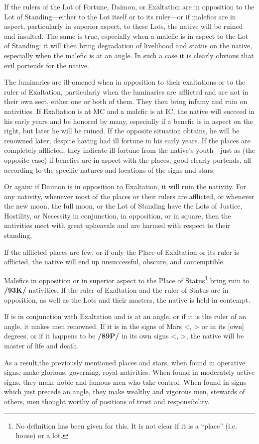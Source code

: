If the rulers of the Lot of Fortune, Daimon, or Exaltation are in opposition to the Lot of Standing—either to the Lot itself or to its ruler—or if malefics are in aspect, particularly in superior aspect, to these Lots, the native will be ruined and insulted. The same is true, especially when a malefic is in
aspect to the Lot of Standing: it will then bring degradation of livelihood and status on the native, especially when the malefic is at an angle. In such a case it is clearly obvious that evil portends for the native.

The luminaries are ill-omened when in opposition to their exaltations or to the ruler of Exaltation, particularly when the luminaries are afflicted and are not in their own sect, either one or both of them. They then bring infamy and ruin on nativities. If Exaltation is at MC and a malefic is at IC, the native will succeed in his early years and be honored by many, especially if a benefic is in aspect on the right, but later he will be ruined. If the opposite situation obtains, he will be renowned later, despite having had ill fortune in his early years. If the places are completely afflicted, they indicate ill-fortune from the native’s youth—just as (the opposite case) if benefics are in aspect with the places, good clearly portends, all according to the specific natures and locations of the signs and stars.

Or again: if Daimon is in opposition to Exaltation, it will ruin the nativity. For any nativity, whenever most of the places or their rulers are afflicted, or whenever the new moon, the full moon, or the Lot of Standing have the Lots of Justice, Hostility, or Necessity in conjunction, in opposition, or in
square, then the nativities meet with great upheavals and are harmed with respect to their standing. 

If the afflicted places are few, or if only the Place of Exaltation or its ruler is afflicted, the native will end up unsuccessful, obscure, and contemptible. 

Malefics in opposition or in superior aspect to the Place of Status\footnote{No definition has been given for this. It is not clear if it is a ``place'' (i.e. house) or a lot.} bring ruin to \textbf{/93K/} nativities. If the ruler of Exaltation and the ruler of Status are in opposition, as well as the Lots and their masters, the native is held in contempt. 

If \Jupiter\xspace is in conjunction with Exaltation and
is at an angle, or if it is the ruler of an angle, it makes men renowned. If it is in the signs of Mars <\Scorpio, \Aries> or in its [own] degrees, or if it happens to be \textbf{/89P/} in its own signs <\Sagittarius, \Pisces>, the native will be master of life and death.

As a result,\mndl the previously mentioned places and stars, when found in operative signs, make glorious, governing, royal nativities. When found in moderately active signs, they make noble and famous men who take control. When found in signs which just precede an angle, they make wealthy and vigorous men, stewards of others, men thought worthy of positions of trust and responsibility.

\newpage
